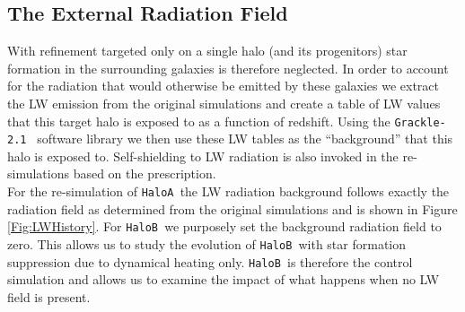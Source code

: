 \documentclass[graphics, twocolumn, usenatbib]{mn2e}
\newcommand{\grackle}{\texttt{Grackle-2.1~}}
\newcommand{\ha} {\texttt{HaloA~}}
\newcommand{\hb} {\texttt{HaloB~}}
\begin{document}
 \subsection{The External Radiation Field} \label{Sec:LWRadField}
 With refinement targeted only on a single halo (and its progenitors) star formation in the surrounding galaxies is therefore neglected. In order to account for the radiation that would otherwise be emitted by these galaxies we extract the LW emission from the original simulations and create a table of LW values that this target halo is exposed to as a function of
 redshift. Using the \grackle \citep{Grackle} software library we then use these LW tables as the ``background'' that this halo is exposed to. Self-shielding to LW radiation is also invoked in the re-simulations based on the \cite{Wolcott-Green_2011} prescription.\\
 \indent For the re-simulation of \ha the LW radiation background follows exactly
 the radiation field as determined from the original simulations and is shown
 in Figure \ref{Fig:LWHistory}. For \hb we purposely set the background radiation field to zero. This allows us to study the evolution of \hb with 
 star formation suppression due to dynamical heating only. \hb is therefore the 
 control simulation and allows us to examine the impact of what happens when
 no LW field is present. 
 
\end{document}
